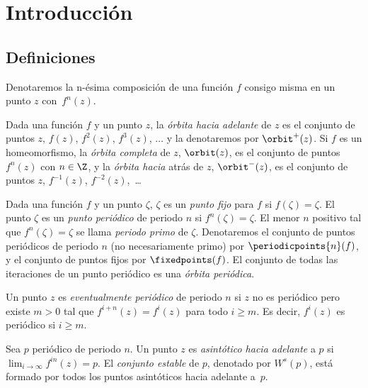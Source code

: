 \chapter{Introducción}

\section{Definiciones}

Denotaremos la n-ésima composición de una función $f$ consigo misma en un punto
$z$ con~$f^n(z)$.

\begin{definicion}[Órbitas]
  Dada una función $f$ y un punto $z$, la \emph{órbita hacia adelante} de $z$
  es el conjunto de puntos $z$, $f(z)$, $f^2(z)$, $f^3(z)$, $\ldots$ y la
  denotaremos por $\orbit^+(z)$. Si $f$ es un homeomorfismo, la \emph{órbita
  completa} de $z$, $\orbit(z)$, es el conjunto de puntos $f^n(z)$ con $n \in
  \Z$, y la \emph{órbita hacia} atrás de $z$, $\orbit^-(z)$, es el conjunto de
  puntos $z$, $f^{-1}(z)$, $f^{-2}(z)$,~\dots
\end{definicion}

\begin{definicion}
  Dada una función $f$ y un punto $\zeta$, $\zeta$ es un \emph{punto fijo} para
  $f$ si $f(\zeta) = \zeta$. El punto $\zeta$ es un \emph{punto periódico} de
  periodo $n$ si $f^n(\zeta) = \zeta$. El menor $n$ positivo tal que
  $f^n(\zeta) = \zeta$ se llama \emph{periodo primo} de $\zeta$. Denotaremos el
  conjunto de puntos periódicos de periodo $n$ (no necesariamente primo) por
  $\periodicpoints{n}(f)$, y el conjunto de puntos fijos por $\fixedpoints(f)$.
  El conjunto de todas las iteraciones de un punto periódico es una
  \emph{órbita periódica}.
\end{definicion}

\begin{definicion}
  Un punto $z$ es \emph{eventualmente periódico} de periodo $n$ si $z$ no es
  periódico pero existe $m > 0$ tal que $f^{i+n}(z) = f^i(z)$ para todo $i \geq
  m$. Es decir, $f^i(z)$ es periódico si $i \geq m$.
\end{definicion}

\begin{definicion}
  Sea $p$ periódico de periodo $n$. Un punto $z$ es \emph{asintótico hacia
  adelante} a $p$ si $\lim_{i \to \infty} f^{in}(z) = p$. El \emph{conjunto
  estable} de $p$, denotado por $W^s(p)$, está formado por todos los puntos
  asintóticos hacia adelante a~$p$.
\end{definicion}

